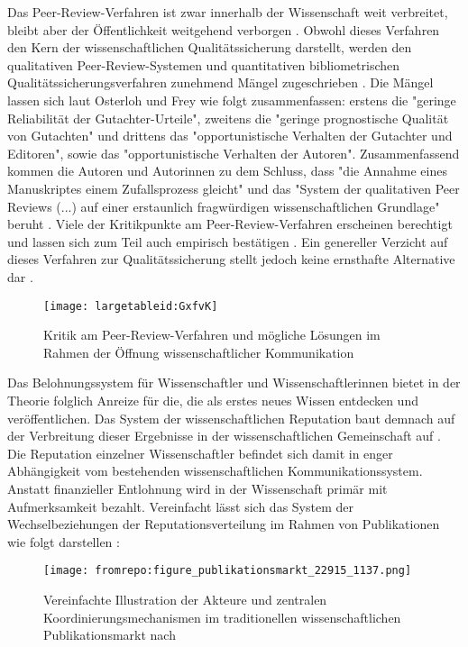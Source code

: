 Das Peer-Review-Verfahren ist zwar innerhalb der Wissenschaft weit verbreitet, bleibt aber der Öffentlichkeit weitgehend verborgen \cite{Konneker_2013}. Obwohl dieses Verfahren den Kern der wissenschaftlichen Qualitätssicherung darstellt, werden den qualitativen Peer-Review-Systemen und quantitativen bibliometrischen Qualitätssicherungsverfahren zunehmend Mängel zugeschrieben \cite{Peters_2014} \cite{Lee_2012} \cite{bar_2009_wissenschaftliche} \cite{osterloh2008anreize} \cite{ware_2008_peer} \cite{Smith_2006} \cite{Jansen_2007} \cite{smith_1999_opening}. Die Mängel lassen sich laut Osterloh und Frey wie folgt zusammenfassen: erstens die "geringe Reliabilität der Gutachter-Urteile", zweitens die "geringe prognostische Qualität von Gutachten" und drittens das "opportunistische Verhalten der Gutachter und Editoren", sowie das "opportunistische Verhalten der Autoren". Zusammenfassend kommen die Autoren und Autorinnen zu dem Schluss, dass "die Annahme eines Manuskriptes einem Zufallsprozess gleicht" und das "System der qualitativen Peer Reviews (...) auf einer erstaunlich fragwürdigen wissenschaftlichen Grundlage" beruht \cite{osterloh2008anreize}. Viele der Kritikpunkte am Peer-Review-Verfahren erscheinen berechtigt und lassen sich zum Teil auch empirisch bestätigen \cite{mueller_2009_peerreview}. Ein genereller Verzicht auf dieses Verfahren zur Qualitätssicherung stellt jedoch keine ernsthafte Alternative dar \cite{Smith_2006}.

\begin{figure}[h!]
\texttt{[image: largetableid:GxfvK]}
\caption{Kritik am Peer-Review-Verfahren und mögliche Lösungen im Rahmen der Öffnung wissenschaftlicher Kommunikation}
\end{figure}

Das Belohnungssystem für Wissenschaftler und Wissenschaftlerinnen bietet in der Theorie folglich Anreize für die, die als erstes neues Wissen entdecken und veröffentlichen. Das System der wissenschaftlichen Reputation baut demnach auf der Verbreitung dieser Ergebnisse in der wissenschaftlichen Gemeinschaft auf \cite{Fabrizio_2008}. Die Reputation einzelner Wissenschaftler befindet sich damit in enger Abhängigkeit vom bestehenden wissenschaftlichen Kommunikationssystem. Anstatt finanzieller Entlohnung wird in der Wissenschaft primär mit Aufmerksamkeit bezahlt. Vereinfacht lässt sich das System der Wechselbeziehungen der Reputationsverteilung im Rahmen von Publikationen wie folgt darstellen \cite{cite:21a}:

\begin{figure}[h!]
\texttt{[image: fromrepo:figure\_publikationsmarkt\_22915\_1137.png]}
\caption{Vereinfachte Illustration der Akteure und zentralen Koordinierungsmechanismen im traditionellen wissenschaftlichen Publikationsmarkt nach \cite{cite:21a}}
\end{figure}

